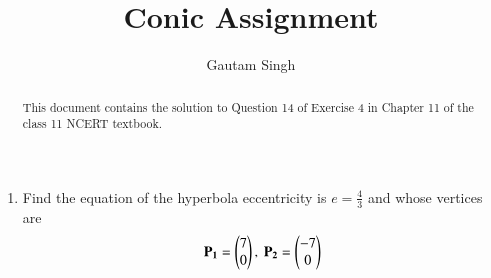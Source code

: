 \documentclass[journal,12pt,twocolumn]{IEEEtran}
\renewcommand{\vec}[1]{\boldsymbol{\mathbf{#1}}}
\begin{document}
\vspace{3cm}
\title{Conic Assignment}
\author{Gautam Singh}
\maketitle
\bigskip

\begin{abstract}
    This document contains the solution to Question 14 of Exercise 4 in Chapter
    11 of the class 11 NCERT textbook.
\end{abstract}

\begin{enumerate}
    \item Find the equation of the hyperbola eccentricity is $e = \frac{4}{3}$
    and whose vertices are
    \begin{align}
        \vec{P_1} = \myvec{7\\0},\ \vec{P_2} = \myvec{-7\\0}
        \label{eq:vert}
    \end{align}


\end{enumerate}
\end{document}
